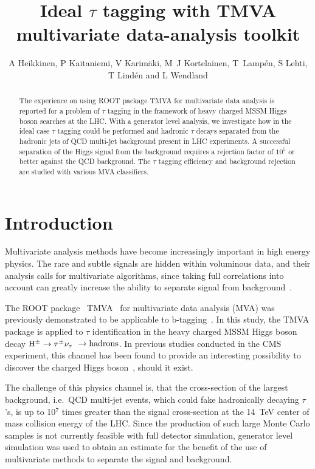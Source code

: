 \documentclass[a4paper]{jpconf}
\newcommand{\Hplustaunu}{\mbox{${\rm H}^{\pm} \to \tau^{\pm}\nu_{\tau}$}}
\begin{document}
\title{Ideal $\tau$ tagging with TMVA multivariate data-analysis toolkit}

\author{A Heikkinen, P Kaitaniemi, V Karim\"{a}ki,
M~J Kortelainen, T~Lamp\'{e}n, S Lehti, T Lind\'{e}n and L Wendland} 

\address{Helsinki Institute of Physics, P.O. Box 64, FIN-00014 University of Helsinki, Finland}



\begin{abstract}
The experience on using ROOT package TMVA for
multivariate data analysis is reported for a problem of $\tau$ tagging in the
framework of heavy charged MSSM Higgs boson searches at the LHC.
With a generator level analysis,
we investigate how in the ideal case $\tau$ tagging could be performed and
hadronic $\tau$ decays separated from the
hadronic jets of QCD multi-jet background present in LHC experiments.
A successful separation of the Higgs signal from the background
requires a rejection factor of $10^5$ or better against the QCD background.
The $\tau$ tagging efficiency and background rejection are studied with various MVA classifiers.
\end{abstract}


\section{Introduction}
Multivariate analysis methods have become increasingly important in high energy physics.
The rare and subtle signals are hidden within voluminous data, 
and their analysis calls for multivariate algorithms, since taking
full correlations into account can greatly increase the ability to separate signal
from background~\cite{statlearn}.


The ROOT package~\cite{root} TMVA~\cite{tmvaguide} for multivariate data analysis (MVA) was previously demonstrated
to be applicable to b-tagging~\cite{chep07tmva}. In this study, the TMVA
package is applied to $\tau$ identification in the heavy charged MSSM Higgs
boson decay \Hplustaunu~$\to {\rm hadrons}$. In previous studies
conducted in the CMS experiment, this channel has been found to
provide an interesting possibility to discover the charged Higgs
boson~\cite{ptdrII}, should it exist.

The challenge of this physics channel is, that the cross-section of the largest background, 
i.e.~QCD multi-jet events, 
which could fake hadronically decaying $\tau$'s, 
is up to 10$^7$ times greater than the signal cross-section at the 14~TeV center of mass
collision energy of the LHC. 
Since the production of such large Monte Carlo samples is not
currently feasible with full detector simulation, generator level
simulation was used to obtain an estimate for the
benefit of the use of multivariate methods to separate the signal and
background.
\end{document}
